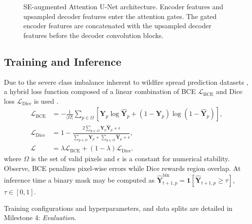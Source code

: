\documentclass[sigconf]{acmart}
\begin{document}
\begin{figure}[ht!]
\caption{SE-augmented Attention U-Net architecture. Encoder features
and upsampled decoder features enter the attention gates. The gated
encoder features are concatenated with the upsampled decoder features
before the decoder convolution blocks.}
\label{fig:architecture}
\end{figure}

\subsection{Training and Inference}
Due to the severe class imbalance inherent to wildfire spread prediction datasets \cite{gerard2023wildfirespreadts}, a hybrid loss function 
composed of a linear combination of BCE 
$\mathcal{L}_{\mathrm{BCE}}$ and Dice loss 
$\mathcal{L}_{\mathrm{Dice}}$ is used \cite{almakrami}. 
\begin{align}
 \mathcal{L}_{\mathrm{BCE}}&=-\frac{1}{|\Omega|}\sum_{p\in\Omega}\left[\mathbf{Y}_p\log \widehat{\mathbf{Y}}_p + (1-\mathbf{Y}_p)\log(1 - \widehat{\mathbf{Y}}_p)\right],\\[-1mm]
 \mathcal{L}_{\mathrm{Dice}}&=1-\frac{2\sum_{p\in\Omega}\mathbf{Y}_p\widehat{\mathbf{Y}}_p+\epsilon}{\sum_{p\in\Omega}\mathbf{Y}_p+\sum_{p\in\Omega}\widehat{\mathbf{Y}}_p + \epsilon},\\[-1mm]
 \mathcal{L}&=\lambda\mathcal{L}_{\mathrm{BCE}}+(1-\lambda)\mathcal{L}_{\mathrm{Dice}}.
 \label{eq:loss}
\end{align}
where $\Omega$ is the set of valid pixels and $\epsilon$ is a constant for numerical stability. Observe, BCE penalizes pixel-wise errors 
while Dice rewards region overlap. At inference time a binary mask may be computed as 
$\widehat{\mathbf{Y}}_{t+1,p}^{\mathrm{bin}}=\mathbf{1}[\widehat{\mathbf{Y}}_{t+1,p}\geq\tau]$, $\tau \in [0,1]$.

Training configurations and hyperparameters, and data splits are detailed in Milestone 4: \textit{Evaluation}.



\end{document}
